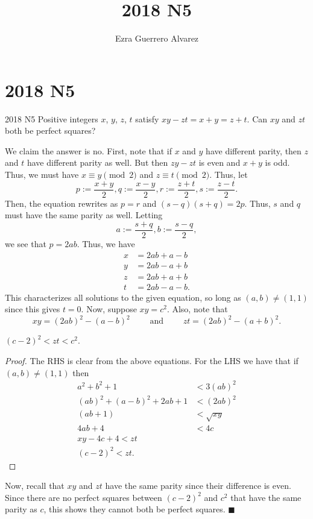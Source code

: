 \documentclass[14pt]{article}
\title{2018 N5}
\author{Ezra Guerrero Alvarez}
\begin{document}
\maketitle
	
\section*{2018 N5}

\begin{statement}{2018 N5}
	Positive integers $x$, $y$, $z$, $t$ satisfy
	$xy - zt = x + y = z + t$.
	Can $xy$ and $zt$ both be perfect squares?
\end{statement}
We claim the answer is no. First, note that if $x$ and $y$ have different parity, then $z$ and $t$ have different parity as well. But then $zy-zt$ is even and $x+y$ is odd. Thus, we must have $x\equiv y\pmod2$ and $z\equiv t\pmod 2$. Thus, let
\[ p:=\frac{x+y}2,q:=\frac{x-y}2,r:=\frac{z+t}2,s:=\frac{z-t}2. \]
Then, the equation rewrites as $p=r$ and $(s-q)(s+q)=2p$. Thus, $s$ and $q$ must have the same parity as well. Letting
\[ a:=\frac{s+q}2,b:=\frac{s-q}2, \]
we see that $p=2ab$. Thus, we have
\begin{align*}
	x&=2ab+a-b\\
	y&=2ab-a+b\\
	z&=2ab+a+b\\
	t&=2ab-a-b.
\end{align*}
This characterizes all solutions to the given equation, so long as $(a,b)\ne(1,1)$ since this gives $t=0$. Now, suppose $xy=c^2$. Also, note that
\[ xy=(2ab)^2-(a-b)^2\qquad\text{ and }\qquad zt=(2ab)^2-(a+b)^2. \]
\begin{claim}
	$(c-2)^2<zt<c^2$.
\end{claim}
\begin{proof}
	The RHS is clear from the above equations. For the LHS we have that if $(a,b)\ne(1,1)$ then
	\begin{align*}
		a^2+b^2+1&<3(ab)^2\\
		(ab)^2+(a-b)^2+2ab+1&<(2ab)^2\\
		(ab+1)&<\sqrt{xy}\\
		4ab+4&<4c\\
		xy-4c+4<zt\\
		(c-2)^2<zt.
	\end{align*}
\end{proof}
Now, recall that $xy$ and $zt$ have the same parity since their difference is even. Since there are no perfect squares between $(c-2)^2$ and $c^2$ that have the same parity as $c$, this shows they cannot both be perfect squares. $\blacksquare$
	
\end{document}
